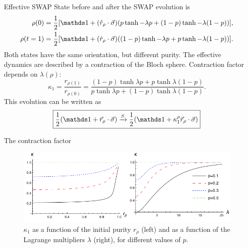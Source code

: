 \begin{frame}{Effective SWAP}
    State before and after the SWAP evolution is
    \begin{align*}
        \rho(0)&=\frac{1}{2}[\Id+(\hat{r}_{\rho}\cdot\vec{\sigma})(p\tanh{-\lambda p}+(1-p)\tanh{-\lambda (1-p)})],\\
        \rho(t=1)&=\frac{1}{2}[\Id+(\hat{r}_{\rho}\cdot\vec{\sigma})((1-p)\tanh{-\lambda p}+p\tanh{-\lambda (1-p)})].
        \end{align*}
    Both states have the same orientation, but different purity. The effective dynamics are described by a contraction of the Bloch sphere. Contraction factor depends on $\lambda(\rho)$:
    \begin{equation*}
        \kappa_{1}=\frac{r_{\rho(1)}}{r_{\rho(0)}}=\frac{(1-p)\tanh{\lambda p}+p\tanh{\lambda (1-p)}}{
          p\tanh{\lambda p}+(1-p)\tanh{\lambda (1-p)}}.
      \end{equation*}
      This evolution can be written as
      \begin{equation*}
        \boxed{\frac{1}{2}(\Id+\vec{r}_{\rho}\cdot\vec{\sigma}) \xrightarrow{S} \frac{1}{2}(\Id+\kappa_{1}^{\rho}\vec{r}_{\rho}\cdot\vec{\sigma})}
      \end{equation*}
\end{frame}

\begin{frame}{The contraction factor}
    \begin{figure}[h!]
        \centering
        \includegraphics[width=0.9\linewidth]{figures/ContractionFactorSWAP_2D_both.png}
        \caption{$\kappa_{1}$ as a function of the initial purity $r_{\rho}$ (left) and as a function of the Lagrange multipliers $\lambda$ (right), for different values of $p$.}
        \label{fig:SWAPFactor2D}
      \end{figure}
\end{frame}

